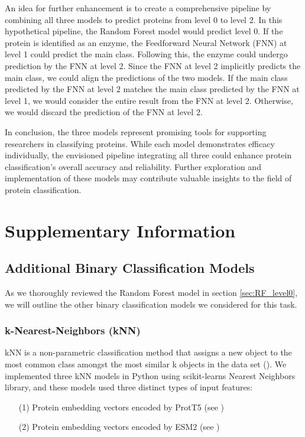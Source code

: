 \documentclass{bioinfo}
\begin{document}
An idea for further enhancement is to create a comprehensive pipeline by combining all three models to predict proteins from level 0 to level 2.
In this hypothetical pipeline, the Random Forest model would predict level 0.
If the protein is identified as an enzyme, the Feedforward Neural Network (FNN) at level 1 could predict the main class.
Following this, the enzyme could undergo prediction by the FNN at level 2.
Since the FNN at level 2 implicitly predicts the main class, we could align the predictions of the two models.
If the main class predicted by the FNN at level 2 matches the main class predicted by the FNN at level 1, 
we would consider the entire result from the FNN at level 2.
Otherwise, we would discard the prediction of the FNN at level 2.

In conclusion, the three models represent promising tools for supporting researchers in classifying proteins. 
While each model demonstrates efficacy individually, the envisioned pipeline integrating all three could enhance protein classification's overall accuracy and reliability.
Further exploration and implementation of these models may contribute valuable insights to the field of protein classification.

\section{Supplementary Information}

\subsection{Additional Binary Classification Models}\label{sec:unused binarys}
As we thoroughly reviewed the Random Forest model in section \ref{sec:RF_level0}, we will outline the other binary classification models we considered for this task.

\subsubsection{k-Nearest-Neighbors (kNN)}
kNN is a non-parametric classification method
that assigns a new object to the most common class amongst the most similar k objects in the data set (\cite{knn_principles}). We implemented three kNN models in Python using scikit-learns Nearest Neighbors library, and 
these models used three distinct types of input features:
\begin{enumerate}
	\item[(1)] Protein embedding vectors encoded by ProtT5 (see \cite{ProtT5})
    \item[(2)] Protein embedding vectors encoded by ESM2 (see \cite{ESM2})
\end{enumerate}
\end{document}

